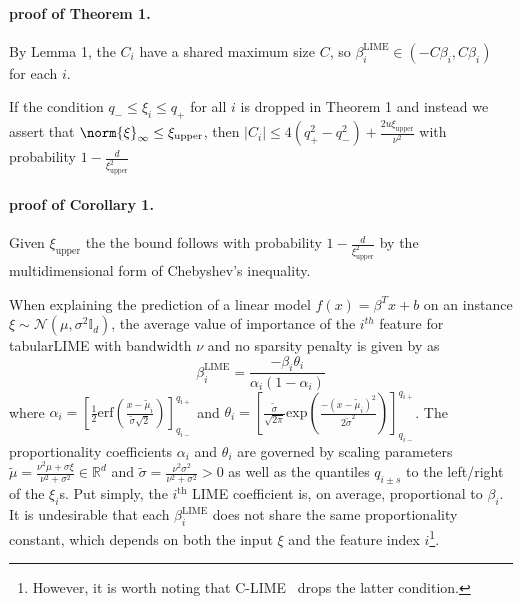 
\paragraph{proof of Theorem 1.}
        By Lemma 1, the $C_i$ have a shared maximum size $C$, so 
        $\beta^{\text{LIME}}_i  \in (-C\beta_i, C\beta_i)$ for each $i$.

\begin{corollary}
    If the condition $q_- \leq \xi_i \leq q_+$ for all $i$ is dropped in Theorem 1 and instead we assert that $\norm{\xi}_\infty \leq \xi_{\text{upper}}$, then $\mid C_i \mid \leq 4(q_+^2 - q_-^2) + \frac{2u\xi_{\text{upper}}}{\nu^2}$ with probability $1-\frac{d}{\xi_{\text{upper}}^2}$
\end{corollary}

\paragraph{proof of Corollary 1.}
    Given $\xi_{\text{upper}}$ the the bound follows with probability $1-\frac{d}{\xi_{\text{upper}}^2}$ by the multidimensional form of Chebyshev's inequality.

            \label{sec:lime_linear_case}
             When explaining the prediction of a linear model $f(x)= \beta^Tx + b$ on an instance $\xi \sim \mathcal{N}(\mu, \sigma^2 \mathbb{I}_d)$, the average value of importance of the $i^{th}$ feature for tabularLIME with bandwidth $\nu$ and no sparsity penalty is given by \citep{garreau20theoretical} as
             \begin{equation}
                \label{eqn:lime_gt}
                \beta^{\text{LIME}}_i=\frac{-\beta_i \theta_i}{\alpha_i(1-\alpha_i)}
             \end{equation}
            where $\alpha_i = \left[\frac{1}{2}\text{erf}\left(\frac{x-\tilde{\mu}_i}{\tilde{\sigma}\sqrt{2}}\right)\right]_{q_{i-}}^{q_{i+}}$ and $\theta_i=\left[\frac{\tilde{\sigma}}{\sqrt{2\pi}}\text{exp}\left(\frac{-(x-\tilde{\mu}_i)^2}{2\tilde{\sigma}^2}\right)\right]_{q_{i-}}^{q_{i+}}$. The proportionality coefficients $\alpha_i$ and $\theta_i$ are governed by scaling parameters $\tilde{\mu} = \frac{\nu^2\mu+\sigma\xi}{\nu^2+\sigma^2} \in \mathbb{R}^d$ and $\tilde{\sigma} = \frac{\nu^2\sigma^2}{\nu^2+\sigma^2} > 0$ as well as the quantiles $q_{i\pm s}$ to the left/right of the $\xi_i$s. Put simply, the $i^{\text{th}}$ LIME coefficient is, on average, proportional to $\beta_i$. It is undesirable that each $\beta^{\text{LIME}}_i$ does not share the same proportionality constant, which depends on both the input $\xi$ and the feature index $i$\footnote{However, it is worth noting that C-LIME~\citep{agarwal21clime} drops the latter condition.}.
             
